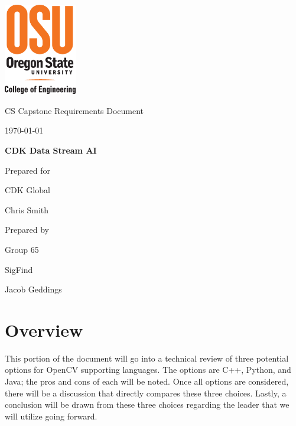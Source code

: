 \documentclass[onecolumn, draftclsnofoot,10pt, compsoc]{IEEEtran}
\def \CapstoneTeamName{		SigFind}
\def \CapstoneTeamNumber{		65}
\def \GroupMemberOne{			Jacob Geddings}
\def \CapstoneProjectName{		CDK Data Stream AI}
\def \CapstoneSponsorCompany{	CDK Global}
\def \CapstoneSponsorPerson{		Chris Smith}
\def \DocType{		%
				Requirements Document
				}
\begin{document}
\begin{titlepage}
    \begin{singlespace}
    	\includegraphics[height=4cm]{coe_v_spot1}
        \hfill 
        \par\vspace{.2in}
        \centering
        \scshape{
            \huge CS Capstone \DocType \par
            {\large\today}\par
            \vspace{.5in}
            \textbf{\Huge\CapstoneProjectName}\par
            \vfill
            {\large Prepared for}\par
            \Huge \CapstoneSponsorCompany\par
            \vspace{5pt}
            {\Large\CapstoneSponsorPerson\par}
            {\large Prepared by }\par
            Group\CapstoneTeamNumber\par
            \CapstoneTeamName\par 
            \vspace{5pt}
            {\Large
                \GroupMemberOne\par
            }
            \vspace{20pt}
        }
  
    \end{singlespace}
\end{titlepage}
\newpage
{}
\tableofcontents
\clearpage

\section{Overview}
This portion of the document will go into a technical review of three potential options for OpenCV supporting languages. The options are C++, Python, and Java; the pros and cons of each will be noted. Once all options are considered, there will be a discussion that directly compares these three choices. Lastly, a conclusion will be drawn from these three choices regarding the leader that we will utilize going forward.
\end{document}
